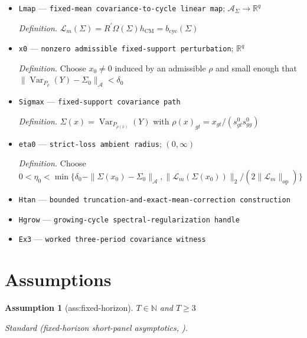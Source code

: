 \documentclass{article}
\newtheorem{assumption}{Assumption}
\begin{document}
\begin{itemize}
  \par\smallskip\noindent\emph{Definition.} \(\mathcal L(m)=\{\Sigma\in\mathcal A_{\Sigma}:\exists P\in\mathcal M_{\mathrm{bd}},\ \mathbb E_PY=m,\ \operatorname{Var}_P(Y_g)=\Sigma_g\succ0\text{ for every }g\in C\}\)
  \item \texttt{Lmap} --- \texttt{fixed-\allowbreak{}mean covariance-\allowbreak{}to-\allowbreak{}cycle linear map}; \(\mathcal A_{\Sigma}\to\mathbb R^q\)
  \par\smallskip\noindent\emph{Definition.} \(\mathcal L_m(\Sigma)=R^{\prime}\Omega(\Sigma)h_{\mathrm{CM}}=b_{\mathrm{cyc}}(\Sigma)\)
  \item \texttt{x0} --- \texttt{nonzero admissible fixed-\allowbreak{}support perturbation}; \(\mathbb R^q\)
  \par\smallskip\noindent\emph{Definition.} Choose \(x_0\ne0\) induced by an admissible \(\rho\) and small enough that \(\|\operatorname{Var}_{P_{\rho}}(Y)-\Sigma_0\|_{\mathcal A}<\delta_0\)
  \item \texttt{Sigmax} --- \texttt{fixed-\allowbreak{}support covariance path}
  \par\smallskip\noindent\emph{Definition.} \(\Sigma(x)=\operatorname{Var}_{P_{\rho(x)}}(Y)\) with \(\rho(x)_{gt}=x_{gt}/(s^0_{gt}s^0_{gg})\)
  \item \texttt{eta0} --- \texttt{strict-\allowbreak{}loss ambient radius}; \((0,\infty)\)
  \par\smallskip\noindent\emph{Definition.} Choose \(0<\eta_0<\min\{\delta_0-\|\Sigma(x_0)-\Sigma_0\|_{\mathcal A},\|\mathcal L_m(\Sigma(x_0))\|_2/(2\|\mathcal L_m\|_{\mathrm{op}})\}\)
  \item \texttt{Htan} --- \texttt{bounded truncation-\allowbreak{}and-\allowbreak{}exact-\allowbreak{}mean-\allowbreak{}correction construction}
  \item \texttt{Hgrow} --- \texttt{growing-\allowbreak{}cycle spectral-\allowbreak{}regularization handle}
  \item \texttt{Ex3} --- \texttt{worked three-\allowbreak{}period covariance witness}
\end{itemize}

\section{Assumptions}

\begin{assumption}[ass:fixed-horizon]\label{ass:fixed-horizon}
\(T\in\mathbb N\) and \(T\ge3\)
\par\smallskip\noindent\emph{Standard} (fixed-horizon short-panel asymptotics, \cite{BorusyakJaravelSpiess2024}).
\end{assumption}
\end{document}
